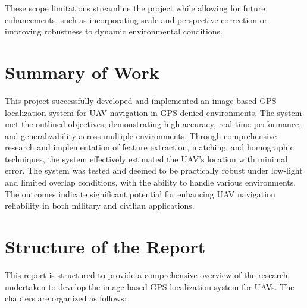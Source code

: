 These scope limitations streamline the project while allowing for future enhancements, such as incorporating scale and perspective correction or improving robustness to dynamic environmental conditions.




\section{Summary of Work}
This project successfully developed and implemented an image-based GPS localization system for UAV navigation in GPS-denied environments. The system met the outlined objectives, demonstrating high accuracy, real-time performance, and generalizability across multiple environments. Through comprehensive research and implementation of feature extraction, matching, and homographic techniques, the system effectively estimated the UAV's location with minimal error. The system was tested and deemed to be practically robust under low-light and limited overlap conditions, with the ability to handle various environments. The outcomes indicate significant potential for enhancing UAV navigation reliability in both military and civilian applications.


\section{Structure of the Report}
This report is structured to provide a comprehensive overview of the research undertaken to develop the image-based GPS localization system for UAVs. The chapters are organized as follows:

